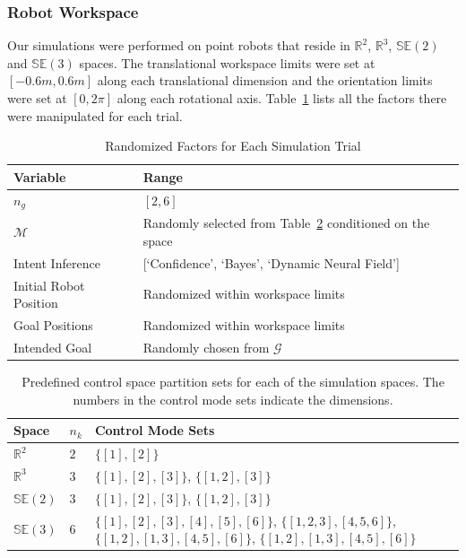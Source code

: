 \documentclass[conference]{IEEEtran}
\begin{document}
\subsubsection{Robot Workspace}
Our simulations were performed on point robots that reside in $\mathbb{R}^2$, $\mathbb{R}^3$, $\mathbb{SE}(2)$ and $\mathbb{SE}(3)$ spaces. The translational workspace limits were set at $[-0.6m, 0.6m]$ along each translational dimension and the orientation limits were set at $[0, 2\pi]$ along each rotational axis. Table~\ref{tbl:manip} lists all the factors there were manipulated for each trial. 
\begin{table}[t]
	\centering
	\begin{tabular}{|p{3cm}|p{3cm}|}
		\hline
		\textbf{Variable} &\textbf{Range}  \\ \hline
		$n_g$ &  $[2,6]$ \\ \hline
		$\mathcal{M}$ & Randomly selected from Table~\ref{tbl:cmp} conditioned on the space\\ \hline
		Intent Inference & [`Confidence', `Bayes', `Dynamic Neural Field'] \\ \hline
		Initial Robot Position & Randomized within workspace limits \\ \hline
		Goal Positions & Randomized within workspace limits \\ \hline
		Intended Goal & Randomly chosen from $\mathcal{G}$ \\ \hline
	\end{tabular}
	\vspace{.2cm}
	\caption{Randomized Factors for Each Simulation Trial} 
	\label{tbl:manip}
	\vspace{-.5cm}
\end{table}
\begin{table}[t]
	\centering
	\begin{tabular}{|p{1cm}|p{0.5cm}|p{3cm}|}
		\hline
		\textbf{Space} & $n_k$ &\textbf{Control Mode Sets}  \\ \hline
		$\mathbb{R}^2$ & $2$ & $\{[1],[2]\}$ \\ \hline
		$\mathbb{R}^3$ & $3$ & $\{[1],[2], [3]\}$, $\{[1,2], [3]\}$ \\ \hline
		$\mathbb{SE}(2)$ & $3$ &  $\{[1],[2],[3]\}$, $\{[1,2], [3]\}$ \\ \hline
		$\mathbb{SE}(3)$ & $6$ & $\{[1],[2],[3],[4],[5],[6]\}$, $\{[1,2,3],  [4,5,6]\}$, $\{[1,2], [1,3], [4,5], [6]\}$, $\{[1,2], [1,3], [4,5], [6]\}$ \\ \hline
	\end{tabular}
	\vspace{.2cm}
	\caption{Predefined control space partition sets for each of the simulation spaces. The numbers in the control mode sets indicate the dimensions. } 
	\label{tbl:cmp}
	\vspace{-.5cm}
\end{table}
\end{document}

